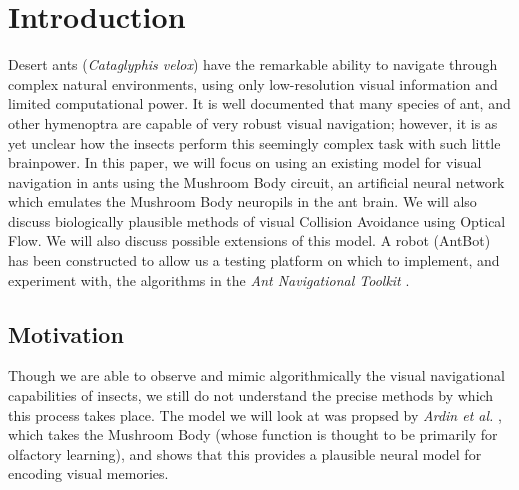 \documentclass[a4paper,11pt,twoside,openright]{article}
\let\oldsection\section
\def\section{\cleardoublepage\oldsection}
\begin{document}
\newpage


\tableofcontents

\newpage

\listoffigures
\newpage

\listoftables
\newpage
\thispagestyle{empty}
\mbox{}
\newpage

\raggedright
\section{ Introduction }
Desert ants (\textit{Cataglyphis velox}) have the
remarkable ability to navigate through complex natural environments, using only low-resolution
visual information and limited computational power. It is well documented that many species of
ant, and other hymenoptra are capable of very robust visual navigation; however, it is as yet
unclear how the insects perform this seemingly complex task with such little brainpower. In this
paper, we will focus on using an existing model for visual navigation
in ants using
the Mushroom Body circuit, an artificial neural network which emulates the Mushroom Body neuropils
in the ant brain. We will also discuss biologically plausible methods of visual Collision Avoidance
using Optical Flow. We will also discuss possible extensions of this model. A robot (AntBot) has been
constructed \cite{Eberding2016} to allow us a testing platform on which to implement,
and experiment with, the algorithms in the \textit{Ant Navigational Toolkit} \cite{Wehner2009}.

\subsection{ Motivation }
Though we are able to observe and mimic algorithmically the visual navigational capabilities
of insects, we still do not understand the precise methods by which this process takes place. The
model we will look at was propsed by \textit{Ardin et al.} \cite{Ardin2016}, which takes
the Mushroom Body (whose function is thought to be primarily for olfactory learning), and shows
that this provides a plausible neural model for encoding visual memories.
\newline
\end{document}
